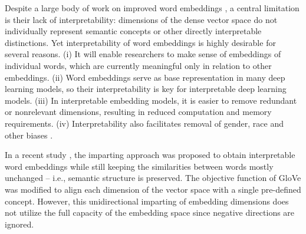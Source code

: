 \documentclass[11pt,a4paper]{article}
\begin{document}
Despite a large body of work on improved word embeddings
\citep{yu2017refining, celikyilmaz15enriching,
  yu14improving, liu15learning, mrksic16counterFitting,
  bollegala16joint, yang16fineTuning}, a central limitation
is their lack of interpretability: dimensions of the dense vector
space do not individually represent semantic concepts
\citep{chen16InfoGAN,levy14dependency} or other directly
interpretable distinctions.
Yet interpretability of word embeddings is highly desirable
for several reasons. 
(i) It will enable researchers to make sense of embeddings
of individual words,  which are currently meaningful only in relation to other embeddings.
(ii) Word embeddings serve as base representation in many deep learning models, so their interpretability is key for interpretable deep learning models.
(iii) In interpretable embedding models, it is easier to remove redundant or nonrelevant dimensions, resulting in reduced computation and memory requirements.
(iv) Interpretability also facilitates removal of gender, race and other biases \citep{dufter19ultraDense}.

In a recent study  \citep{senel20impart}, the imparting approach was proposed to obtain
interpretable word embeddings while still keeping
the similarities between words mostly unchanged -- i.e., semantic structure is preserved. The
objective function of GloVe 
\citep{pennington14glove} was modified to align each
dimension of the vector space with a single
pre-defined concept. However, this unidirectional imparting
of embedding dimensions does not utilize the full capacity
of the embedding space since negative directions are
ignored.


\end{document}
